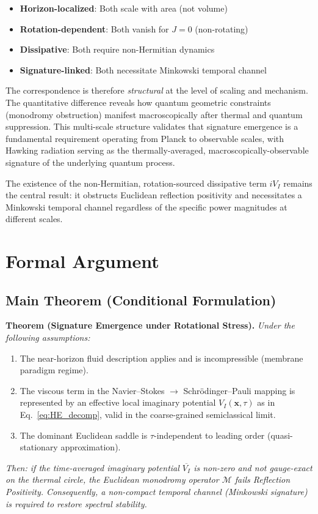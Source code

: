 \documentclass[11pt]{article}
\begin{document}
\begin{itemize}
\item \textbf{Horizon-localized}: Both scale with area (not volume)
\item \textbf{Rotation-dependent}: Both vanish for $J=0$ (non-rotating)
\item \textbf{Dissipative}: Both require non-Hermitian dynamics
\item \textbf{Signature-linked}: Both necessitate Minkowski temporal channel
\end{itemize}

The correspondence is therefore \emph{structural} at the level of scaling and 
mechanism. The quantitative difference reveals how quantum geometric constraints 
(monodromy obstruction) manifest macroscopically after thermal and quantum 
suppression. This multi-scale structure validates that signature emergence is a 
fundamental requirement operating from Planck to observable scales, with Hawking 
radiation serving as the thermally-averaged, macroscopically-observable signature 
of the underlying quantum process.

The existence of the non-Hermitian, rotation-sourced dissipative term $iV_I$ 
remains the central result: it obstructs Euclidean reflection positivity and 
necessitates a Minkowski temporal channel regardless of the specific power 
magnitudes at different scales.

\section{Formal Argument}

\subsection{Main Theorem (Conditional Formulation)}

\textbf{Theorem (Signature Emergence under Rotational Stress).}
\emph{Under the following assumptions:}
\begin{enumerate}[label=(\Alph*)]
    \item The near-horizon fluid description applies and is incompressible (membrane paradigm regime).
    \item The viscous term in the Navier–Stokes $\to$ Schr\"odinger–Pauli mapping is represented by an effective local imaginary potential $V_I(\mathbf{x},\tau)$ as in Eq.~\eqref{eq:HE_decomp}, valid in the coarse-grained semiclassical limit.
    \item The dominant Euclidean saddle is $\tau$-independent to leading order (quasi-stationary approximation).
\end{enumerate}
\emph{Then: if the time-averaged imaginary potential $\overline{V_I}$ is non-zero and not gauge-exact on the thermal circle, the Euclidean monodromy operator $\mathcal{M}$ fails Reflection Positivity. Consequently, a non-compact temporal channel (Minkowski signature) is required to restore spectral stability.}
\end{document}
